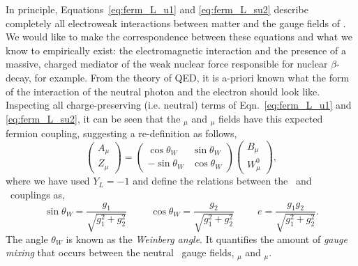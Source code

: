In principle, Equations~\ref{eq:ferm_L_u1} and \ref{eq:ferm_L_su2} describe completely
all electroweak interactions
between matter and the gauge fields of \SUewk. We would like to make the correspondence
between these equations and what we know to empirically exist: the electromagnetic interaction
and the presence of a massive, charged mediator of the weak nuclear force responsible
for nuclear $\beta$-decay, for example. From the theory of QED, it is a-priori known what the
form of the interaction of the neutral photon and the electron should look like.
Inspecting all charge-preserving (i.e. neutral) terms of Eqn.~\ref{eq:ferm_L_u1} and \ref{eq:ferm_L_su2},
it can be seen that the \fieldB$_{\mu}$ and \fieldWzero$_{\mu}$ fields have this expected
fermion coupling, suggesting a re-definition as follows,
\begin{equation}
	\left( \begin{matrix} A_{\mu} \\ Z_{\mu} \end{matrix} \right) = \left( \begin{matrix} \cos \theta_W & \sin \theta_W \\ -\sin \theta_W & \cos \theta_W \end{matrix} \right) \left( \begin{matrix} B_{\mu} \\ W_{\mu}^0 \end{matrix} \right),
	\label{eq:su2rotation}
\end{equation}
where we have used $Y_L = -1$ and define the relations between the \SUtwo~and \Uone~couplings as,
\begin{equation}
\sin \theta_W = \frac{g_1}{\sqrt{g_1^2 + g_2^2}} \hspace{1cm} \cos \theta_W = \frac{g_2}{\sqrt{g_1^2 + g_2^2}} \hspace{1cm} e = \frac{g_1 g_2}{\sqrt{g_1^2 + g_2^2}}.
\label{eq:weinberg_angles}
\end{equation}
The angle $\theta_W$  is known as the \textit{Weinberg angle}. It quantifies the amount of
\textit{gauge mixing} that occurs between the neutral
\SUewk~gauge fields, \fieldB$_{\mu}$ and \fieldWzero$_{\mu}$.

